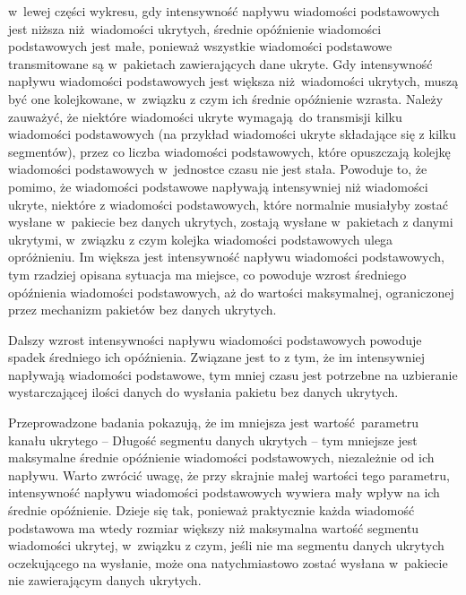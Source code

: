\documentclass[a4paper, twoside, 12pt]{report}
\begin{document}
            w~lewej części wykresu, gdy intensywność napływu wiadomości podstawowych
            jest niższa niż wiadomości ukrytych, średnie opóźnienie wiadomości
            podstawowych jest małe, ponieważ wszystkie wiadomości podstawowe transmitowane
            są w~pakietach zawierających dane ukryte. Gdy intensywność napływu wiadomości
            podstawowych jest większa niż wiadomości ukrytych, muszą być one kolejkowane,
            w~związku z czym ich średnie opóźnienie wzrasta. Należy zauważyć, że
            niektóre wiadomości ukryte wymagają do transmisji kilku wiadomości
            podstawowych (na przykład wiadomości ukryte składające się z kilku segmentów),
            przez co liczba wiadomości podstawowych, które opuszczają kolejkę wiadomości
            podstawowych w~jednostce czasu nie jest stała. Powoduje to, że pomimo,
            że wiadomości podstawowe napływają intensywniej niż wiadomości ukryte,
            niektóre z wiadomości podstawowych, które normalnie musiałyby zostać
            wysłane w~pakiecie bez danych ukrytych, zostają wysłane w~pakietach
            z danymi ukrytymi, w~związku z czym kolejka wiadomości podstawowych
            ulega opróżnieniu. Im większa jest intensywność napływu wiadomości
            podstawowych, tym rzadziej opisana sytuacja ma miejsce, co powoduje
            wzrost średniego opóźnienia wiadomości podstawowych, aż do wartości
            maksymalnej, ograniczonej przez mechanizm pakietów bez danych ukrytych.

            Dalszy wzrost intensywności napływu wiadomości podstawowych powoduje
            spadek średniego ich opóźnienia. Związane jest to z tym, że im intensywniej
            napływają wiadomości podstawowe, tym mniej czasu jest potrzebne na uzbieranie
            wystarczającej ilości danych do wysłania pakietu bez danych ukrytych.

            Przeprowadzone badania pokazują, że im mniejsza jest wartość parametru
            kanału ukrytego -- Długość segmentu danych ukrytych -- tym mniejsze
            jest maksymalne średnie opóźnienie wiadomości podstawowych, niezależnie
            od ich napływu. Warto zwrócić uwagę, że przy skrajnie małej wartości tego
            parametru, intensywność napływu wiadomości podstawowych wywiera mały
            wpływ na ich średnie opóźnienie. Dzieje się tak, ponieważ praktycznie
            każda wiadomość podstawowa ma wtedy rozmiar większy niż maksymalna wartość
            segmentu wiadomości ukrytej, w~związku z czym, jeśli nie ma segmentu
            danych ukrytych oczekującego na wysłanie, może ona natychmiastowo
            zostać wysłana w~pakiecie nie zawierającym danych ukrytych.
\end{document}
